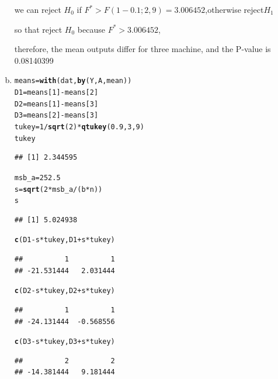 \documentclass{article}\usepackage[]{graphicx}\usepackage[]{color}
\makeatletter
\newcommand{\hlnum}[1]{\textcolor[rgb]{0.686,0.059,0.569}{#1}}%
\newcommand{\hlopt}[1]{\textcolor[rgb]{0,0,0}{#1}}%
\newcommand{\hlstd}[1]{\textcolor[rgb]{0.345,0.345,0.345}{#1}}%
\newcommand{\hlkwb}[1]{\textcolor[rgb]{0.69,0.353,0.396}{#1}}%
\newcommand{\hlkwd}[1]{\textcolor[rgb]{0.737,0.353,0.396}{\textbf{#1}}}%
\newenvironment{kframe}{%
 \def\at@end@of@kframe{}%
 \ifinner\ifhmode%
  \def\at@end@of@kframe{\end{minipage}}%
  \begin{minipage}{\columnwidth}%
 \fi\fi%
 \def\FrameCommand##1{\hskip\@totalleftmargin \hskip-\fboxsep
 \colorbox{shadecolor}{##1}\hskip-\fboxsep
     \hskip-\linewidth \hskip-\@totalleftmargin \hskip\columnwidth}%
 \MakeFramed {\advance\hsize-\width
   \@totalleftmargin\z@ \linewidth\hsize
   \@setminipage}}%
 {\par\unskip\endMakeFramed%
 \at@end@of@kframe}
\newenvironment{knitrout}{}{} %
\makeatother
\begin{document}
\begin{enumerate}[(a)]
\begin{center}
we can reject $H_0$ if $F^* > F(1-0.1;2,9)=3.006452$,otherwise reject$H_1$

so that reject $H_0$ because $F^*>3.006452$,

therefore, the mean outputs differ for three machine, and the P-value is 0.08140399
\end{center}

\item

\begin{knitrout}
\color{fgcolor}\begin{kframe}
\begin{alltt}
  \hlstd{means} \hlkwb{=} \hlkwd{with}\hlstd{(dat,} \hlkwd{by}\hlstd{(Y, A, mean))}
  \hlstd{D1} \hlkwb{=} \hlstd{means[}\hlnum{1}\hlstd{]} \hlopt{-} \hlstd{means[}\hlnum{2}\hlstd{]}
  \hlstd{D2} \hlkwb{=} \hlstd{means[}\hlnum{1}\hlstd{]} \hlopt{-} \hlstd{means[}\hlnum{3}\hlstd{]}
  \hlstd{D3} \hlkwb{=} \hlstd{means[}\hlnum{2}\hlstd{]} \hlopt{-} \hlstd{means[}\hlnum{3}\hlstd{]}
  \hlstd{tukey} \hlkwb{=} \hlnum{1}\hlopt{/}\hlkwd{sqrt}\hlstd{(}\hlnum{2}\hlstd{)}\hlopt{*}\hlkwd{qtukey}\hlstd{(}\hlnum{0.9}\hlstd{,} \hlnum{3}\hlstd{,} \hlnum{9}\hlstd{)}
  \hlstd{tukey}
\end{alltt}
\begin{verbatim}
## [1] 2.344595
\end{verbatim}
\begin{alltt}
  \hlstd{msb_a} \hlkwb{=} \hlnum{252.5}
  \hlstd{s} \hlkwb{=} \hlkwd{sqrt}\hlstd{(}\hlnum{2}\hlopt{*}\hlstd{msb_a}\hlopt{/}\hlstd{(b}\hlopt{*}\hlstd{n))}
  \hlstd{s}
\end{alltt}
\begin{verbatim}
## [1] 5.024938
\end{verbatim}
\begin{alltt}
  \hlkwd{c}\hlstd{(D1}\hlopt{-}\hlstd{s}\hlopt{*}\hlstd{tukey, D1}\hlopt{+}\hlstd{s}\hlopt{*}\hlstd{tukey)}
\end{alltt}
\begin{verbatim}
##          1          1 
## -21.531444   2.031444
\end{verbatim}
\begin{alltt}
  \hlkwd{c}\hlstd{(D2}\hlopt{-}\hlstd{s}\hlopt{*}\hlstd{tukey, D2}\hlopt{+}\hlstd{s}\hlopt{*}\hlstd{tukey)}
\end{alltt}
\begin{verbatim}
##          1          1 
## -24.131444  -0.568556
\end{verbatim}
\begin{alltt}
  \hlkwd{c}\hlstd{(D3}\hlopt{-}\hlstd{s}\hlopt{*}\hlstd{tukey, D3}\hlopt{+}\hlstd{s}\hlopt{*}\hlstd{tukey)}
\end{alltt}
\begin{verbatim}
##          2          2 
## -14.381444   9.181444
\end{verbatim}
\end{kframe}
\end{knitrout}


\end{enumerate}
\end{document}
